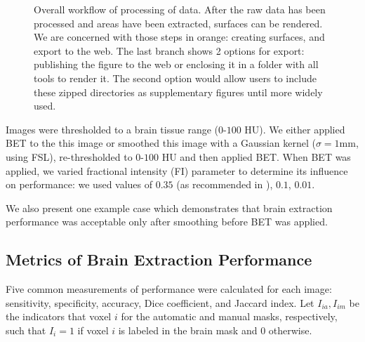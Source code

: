 \documentclass{article}\usepackage[]{graphicx}\usepackage[]{color}
\begin{document}
\begin{figure}
\centering
{}
\caption{Overall workflow of processing of data.  After the raw data has been processed and areas have been extracted, surfaces can be rendered.  We are concerned with those steps in orange: creating surfaces, and export to the web.  The last branch shows 2 options for export: publishing the figure to the web or enclosing it in a folder with all tools to render it.  The second option would allow users to include these zipped directories as supplementary figures until more widely used.   }
\label{fig:framework}
\end{figure}

Images were thresholded to a brain tissue range ($0$-$100$ HU).
We either applied BET to the this image or smoothed this image with a Gaussian kernel ($\sigma=1$mm, using FSL), re-thresholded to $0$-$100$ HU and then applied BET.  When BET was applied, we varied fractional intensity (FI) parameter to determine its influence on performance: we used values of $0.35$ (as recommended in \citet{rorden_age-specific_2012}), $0.1$, $0.01$.  

We also present one example case which demonstrates that brain extraction performance was acceptable only after smoothing before BET was applied.  


\subsection{Metrics of Brain Extraction Performance}
Five common measurements of performance were calculated for each image: sensitivity, specificity, accuracy, Dice coefficient, and Jaccard index.  Let $I_{ia}, I_{im}$ be the indicators that voxel $i$ for the automatic and manual masks, respectively, such that $I_{i} = 1$ if voxel $i$ is labeled in the brain mask and $0$ otherwise.  
\end{document}
